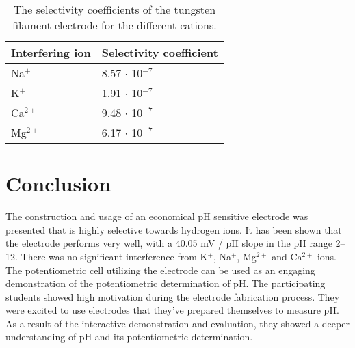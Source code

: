 \documentclass[manuscript=article, journal=jceda8]{achemso}
\begin{document}
\begin{comment}
\begin{figure}
\centering
\begin{tikzpicture}
\begin{axis}	[
		legend style={draw=none, at={(0.5,0.98)}, anchor=north},
		xmin=0,
		xmax=660,
		ymin=-500,
		ymax=-50,
		width=12cm,
		height=8cm,
		xlabel=t / s,
		ylabel=E vs. Ag/AgCl/KCl(3 M) / mV
		]
\addplot [color=red, only marks] table {data/calibration/time_dep.csv};
\end{axis}
\end{tikzpicture}
	\caption{A két mikroelektród kalibrációs mérései. Összehasonlításképpen egy üvegelektród egyidejűleg mért potenciál--idő mérését is ábrázoltam. A potenciált mindhárom elektród esetében az üvegelektród belső, Ag/AgCl/KCl (3 M) referencia félcellájához képest mértem egy kellően nagy bemeneti impedanciájú feszültségmérő (eDAQ isopod EPU) felhasználásával.}
\label{fig:kalibracios_meres}
\end{figure}
\end{comment}

\begin{table}[]
\caption{The selectivity coefficients of the tungsten filament electrode for the different cations.}
\label{table:selectivity}
\begin{tabular}{ll}
Interfering ion & Selectivity coefficient \\
\hline
Na$^+$             & 8.57 $\cdot$ 10$^{-7}$              \\
K$^+$              & 1.91 $\cdot$ 10$^{-7}$              \\
Ca$^{2+}$            & 9.48 $\cdot$ 10$^{-7}$              \\
Mg$^{2+}$            & 6.17 $\cdot$ 10$^{-7}$            
\end{tabular}
\end{table}

\section{Conclusion}
	
The construction and usage of an economical pH sensitive electrode was presented that is highly selective towards hydrogen ions. It has been shown that the electrode performs very well, with a 40.05 mV / pH slope in the pH range 2--12. There was no significant interference from K$^+$, Na$^+$, Mg$^{2+}$ and Ca$^{2+}$ ions.
The potentiometric cell utilizing the electrode can be used as an engaging demonstration of the potentiometric determination of pH. The participating students showed high motivation during the electrode fabrication process. They were excited to use electrodes that they've prepared themselves to measure pH. As a result of the interactive demonstration and evaluation, they showed a deeper understanding of pH and its potentiometric determination.
\end{document}

